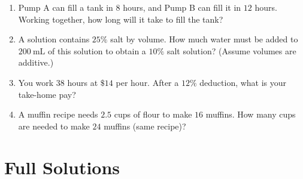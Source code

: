 \documentclass[11pt]{article}
\begin{document}
\begin{enumerate}
  \item Pump A can fill a tank in \(8\) hours, and Pump B can fill it in \(12\) hours. Working together, how long will it take to fill the tank?
  \item A solution contains \(25\%\) salt by volume. How much water must be added to \(200\ \text{mL}\) of this solution to obtain a \(10\%\) salt solution? (Assume volumes are additive.)
  \item You work \(38\) hours at \(\$14\) per hour. After a \(12\%\) deduction, what is your take-home pay?
  \item A muffin recipe needs \(2.5\) cups of flour to make \(16\) muffins. How many cups are needed to make \(24\) muffins (same recipe)?
\end{enumerate}

\newpage
\section*{Full Solutions}
\end{document}
